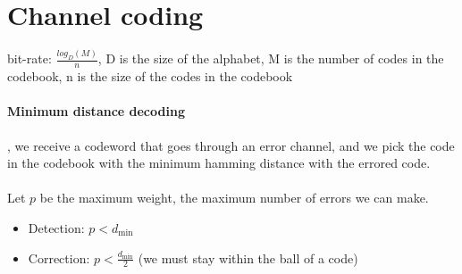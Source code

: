 \documentclass{article}
\begin{document}
\section{Channel coding}

bit-rate: $\frac{log_D(M)}{n}$, D is the size of the alphabet, M is the number of codes in the codebook, n is the size of the codes in the codebook

\paragraph{Minimum distance decoding}, we receive a codeword that goes through an error channel, and we pick the code in the codebook with the minimum hamming distance with the errored code.\\\\
Let \( p \) be the maximum weight, the maximum number of errors we can make.

\begin{itemize}
    \item Detection: \( p < d_{\text{min}} \)
    \item Correction: \( p < \frac{d_{\text{min}}}{2} \) (we must stay within the ball of a code)
\end{itemize}
\end{document}
